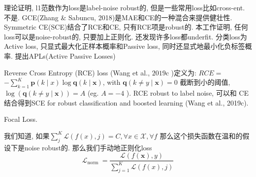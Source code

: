 \documentclass{article}
\begin{document}
理论证明, l1范数作为loss是label-noise robust的, 但是一些常用loss比如cross-ent. 不是. GCE(Zhang \& Sabuncu, 2018)是MAE和CE的一种混合来提供健壮性. Symmetric CE(SCE)结合了RCE和CE, 只有RCE项是robust的. 本工作证明, 任何loss可以是noise-robust的, 只要加上正则化. 还发现许多loss都underfit. 分类loss为Active loss, 只显式最大化正样本概率和Passive loss, 同时还显式地最小化负标签概率. 提出APLs(Active Passive Losses)

Reverse Cross Entropy (RCE) loss (Wang et al., $2019 \mathrm{c}$ )定义为: $R C E=$ $-\sum_{k=1}^{K} \boldsymbol{p}(k \mid x) \log \boldsymbol{q}(k \mid \boldsymbol{x})$, with $\boldsymbol{q}(k \neq y \mid \boldsymbol{x})=0$ 截断到小的阈值, $\log (\boldsymbol{q}(k \neq y \mid \boldsymbol{x}))=A$ (eg. $A=-4$ ). RCE robust to label noise, 可以和 CE结合得到SCE for robust classification and boosted learning (Wang et al., 2019c).

Focal Loss.

我们知道, 如果$\sum_{j}^{K} \mathcal{L}(f(x), j)=C, \forall x \in \mathcal{X}, \forall f$
那么这个损失函数在温和的假设下是noise robust的. 那么我们手动地正则化loss
\begin{equation}
    \mathcal{L}_{\text {norm }}=\frac{\mathcal{L}(f(\boldsymbol{x}), y)}{\sum_{j=1}^{K} \mathcal{L}(f(x), j)}
\end{equation}
\end{document}
